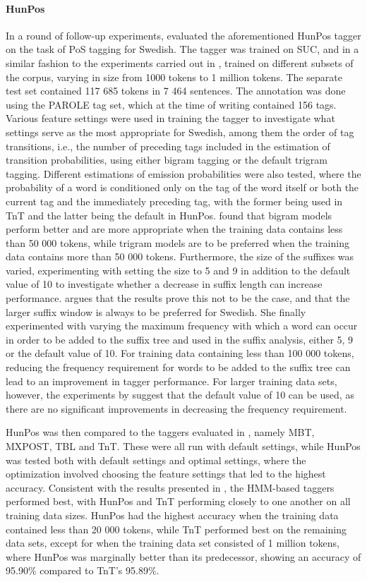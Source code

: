\documentclass[a4paper,12pt,english]{book}
\begin{document}
\paragraph{HunPos}
In a round of follow-up experiments,  evaluated the
aforementioned HunPos tagger on the task of PoS tagging for Swedish. The tagger
was trained on SUC, and in a similar fashion to the experiments carried out in
, trained on different subsets of the corpus, varying in size
from 1000 tokens to 1 million tokens. The separate test set contained 117 685
tokens in 7 464 sentences. The annotation was done using the PAROLE tag set,
which at the time of writing contained 156 tags. Various feature settings were
used in training the tagger to investigate what settings serve as the most
appropriate for Swedish, among them the order of tag transitions, i.e., the
number of preceding tags included in the estimation of transition
probabilities, using either bigram tagging or the default trigram tagging.
Different estimations of emission probabilities were also tested, where the
probability of a word is conditioned only on the tag of the word itself or both
the current tag and the immediately preceding tag, with the former being used
in TnT and the latter being the default in HunPos.  found that
bigram models perform better and are more appropriate when the training data
contains less than 50 000 tokens, while trigram models are to be preferred when
the training data contains more than 50 000 tokens. Furthermore, the size of
the suffixes was varied, experimenting with setting the size to 5 and 9 in
addition to the default value of 10 to investigate whether a decrease in suffix
length can increase performance.  argues that the results prove
this not to be the case, and that the larger suffix window is always to be
preferred for Swedish. She finally experimented with varying the maximum
frequency with which a word can occur in order to be added to the suffix tree
and used in the suffix analysis, either 5, 9 or the default value of 10. For
training data containing less than 100 000 tokens, reducing the frequency
requirement for words to be added to the suffix tree can lead to an improvement
in tagger performance. For larger training data sets, however, the experiments
by  suggest that the default value of 10 can be used, as there
are no significant improvements in decreasing the frequency requirement.

HunPos was then compared to the taggers evaluated in , namely
MBT, MXPOST, TBL and TnT. These were all run with default settings, while
HunPos was tested both with default settings and optimal settings, where the
optimization involved choosing the feature settings that led to the highest
accuracy. Consistent with the results presented in , the
HMM-based taggers performed best, with HunPos and TnT performing closely to one
another on all training data sizes. HunPos had the highest accuracy when the
training data contained less than 20 000 tokens, while TnT performed best on
the remaining data sets, except for when the training data set consisted of 1
million tokens, where HunPos was marginally better than its predecessor,
showing an accuracy of 95.90\% compared to TnT's 95.89\%.
\end{document}
